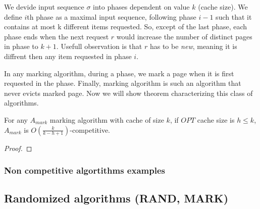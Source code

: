 We devide input sequence $\sigma$ into phases dependent on value $k$ (cache 
size). We define $i$th phase as a maximal input sequence, following phase $i-1$ 
such that it contains at most k different items requested. So, except of the 
last phase, each phase ends when the next request $r$ would increase the number 
of distinct pages in phase to $k+1$. Usefull observation is that $r$ has to be 
\textit{new}, meaning it is diffrent then any item requested in phase $i$.


In any marking algorithm, during a phase, we mark a page when it is first 
requested in the phase. Finally, marking algorithm is such an algorithm that 
never evicts marked page. Now we will show theorem characterizing this class of 
algorithms.
\begin{theorem}
For any $A_{mark}$ marking algorithm with cache of size $k$, if $OPT$ cache 
size is $h \leq k$, $A_{mark}$ is $O(\frac{k}{k-h+1})$-competitive.
\end{theorem}
\begin{proof}
 
\end{proof}



\subsubsection{Non competitive algortithms examples}

\subsection{Randomized algorithms (RAND, MARK)}